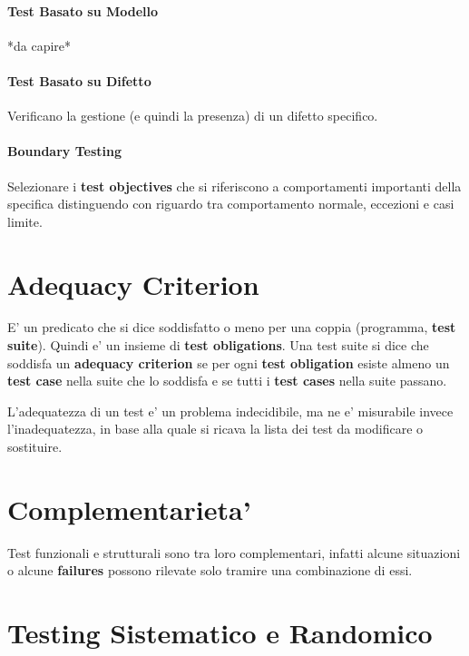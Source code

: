 \paragraph{Test Basato su Modello}

*da capire*

\paragraph{Test Basato su Difetto}

Verificano la gestione (e quindi la presenza) di un difetto specifico.

\paragraph{Boundary Testing}

Selezionare i \textbf{test objectives} che si riferiscono a comportamenti importanti della specifica distinguendo con riguardo tra comportamento normale, eccezioni e casi limite.

\section{Adequacy Criterion}

E' un predicato che si dice soddisfatto o meno per una coppia (programma, \textbf{test suite}).
Quindi e' un insieme di \textbf{test obligations}.
Una test suite si dice che soddisfa un \textbf{adequacy criterion} se per ogni \textbf{test obligation} esiste almeno un \textbf{test case} nella suite che lo soddisfa e se tutti i \textbf{test cases} nella suite passano.

L'adequatezza di un test e' un problema indecidibile, ma ne e' misurabile invece l'inadequatezza, in base alla quale si ricava la lista dei test da modificare o sostituire.

\section{Complementarieta'}

Test funzionali e strutturali sono tra loro complementari, infatti alcune situazioni o alcune \textbf{failures} possono rilevate solo tramire una combinazione di essi.

\section{Testing Sistematico e Randomico}

